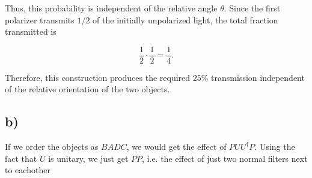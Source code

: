 \documentclass[11pt,a4paper]{article}
\begin{document}
Thus, this probability is independent of the relative angle $\theta$. Since the first polarizer transmits $1/2$ of the initially unpolarized light, the total fraction transmitted is

$$
    \frac{1}{2}\cdot\frac{1}{2}
    =
    {\frac{1}{4}}.
$$

Therefore, this construction produces the required $25\%$ transmission independent of the relative orientation of the two objects.

\subsection*{b)}
If we order the objects as $BADC$, we would get the effect of $PUU^\dagger P$. Using the fact that $U$ is unitary, we just get $PP$, i.e. the effect of just two normal filters next to eachother
\end{document}
